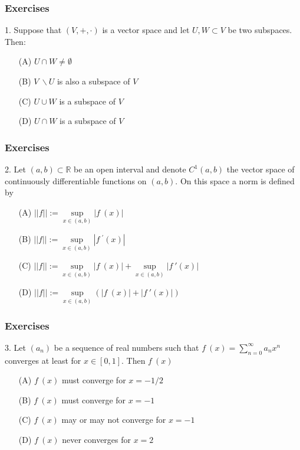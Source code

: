 \documentclass{beamer}
\newcommand{\R}{\mathbb{R}}
\begin{document}
\begin{frame}
    \frametitle{Exercises}
    \hspace{1em}
    1. Suppose that $(V,+,\cdot)$ is a vector space and let $U,W\subset V$ be two
    subspaces. Then:
    \vspace{1em}
    \begin{center}
        \begin{itemize}
            \item[(A)]$U\cap W \neq \emptyset$
            \item[(B)]$V~ \backslash U$ is also a subspace of $V$
            \item[(C)]$U\cup W$ is a subspace of $V$
            \item[(D)]$U\cap W$ is a subspace of $V$
        \end{itemize}
    \end{center}
\end{frame}
\begin{frame}
    \frametitle{Exercises}

    \hspace{1em}
    2. Let $(a,b)\subset \R$ be an open interval and denote  $C^1(a,b)$ the vector
    space of continuously differentiable functions on $(a,b)$. On this space a norm is defined by
    \vspace{1em}
    \begin{itemize}
        \item[(A)]$||f||:=\underset{x\in (a,b)}{\sup} |f~(x)|$
        \item[(B)]$||f||:=\underset{x\in (a,b)}{\sup} |f~^\prime(x)|$
        \item[(C)]$||f||:=\underset{x\in (a,b)}{\sup} |f~(x)|+\underset{x\in (a,b)}{\sup} |f~'(x)|$
        \item[(D)]$||f||:=\underset{x\in (a,b)}{\sup} (|f~(x)|+|f~'(x)|)$
    \end{itemize}
\end{frame}
\begin{frame}
    \frametitle{Exercises}
    \hspace{1em}
    3. Let $(a_n)$ be a sequence of real numbers such that
    $f~(x)=\sum_{n=0}^\infty a_n x^n$ converges at least for
    $x \in [0,1]$. Then $f~(x)$
    \vspace{1em}
    \begin{itemize}
        \item[(A)] $f~(x)$ must converge for $x=-1/2$
        \item[(B)] $f~(x)$ must converge for $x=-1$
        \item[(C)] $f~(x)$ may or may not converge for $x=-1$
        \item[(D)] $f~(x)$ never converges for $x=2$
    \end{itemize}
\end{frame}
\end{document}
